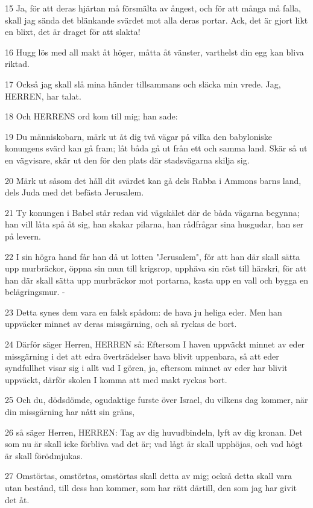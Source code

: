 \par 15 Ja, för att deras hjärtan må försmälta av ångest, och för att många må falla, skall jag sända det blänkande svärdet mot alla deras portar. Ack, det är gjort likt en blixt, det är draget för att slakta!
\par 16 Hugg lös med all makt åt höger, måtta åt vänster, varthelst din egg kan bliva riktad.
\par 17 Också jag skall slå mina händer tillsammans och släcka min vrede. Jag, HERREN, har talat.
\par 18 Och HERRENS ord kom till mig; han sade:
\par 19 Du människobarn, märk ut åt dig två vägar på vilka den babyloniske konungens svärd kan gå fram; låt båda gå ut från ett och samma land. Skär så ut en vägvisare, skär ut den för den plats där stadsvägarna skilja sig.
\par 20 Märk ut såsom det håll dit svärdet kan gå dels Rabba i Ammons barns land, dels Juda med det befästa Jerusalem.
\par 21 Ty konungen i Babel står redan vid vägskälet där de båda vägarna begynna; han vill låta spå åt sig, han skakar pilarna, han rådfrågar sina husgudar, han ser på levern.
\par 22 I sin högra hand får han då ut lotten "Jerusalem", för att han där skall sätta upp murbräckor, öppna sin mun till krigsrop, upphäva sin röst till härskri, för att han där skall sätta upp murbräckor mot portarna, kasta upp en vall och bygga en belägringsmur. -
\par 23 Detta synes dem vara en falsk spådom: de hava ju heliga eder. Men han uppväcker minnet av deras missgärning, och så ryckas de bort.
\par 24 Därför säger Herren, HERREN så: Eftersom I haven uppväckt minnet av eder missgärning i det att edra överträdelser hava blivit uppenbara, så att eder syndfullhet visar sig i allt vad I gören, ja, eftersom minnet av eder har blivit uppväckt, därför skolen I komma att med makt ryckas bort.
\par 25 Och du, dödsdömde, ogudaktige furste över Israel, du vilkens dag kommer, när din missgärning har nått sin gräns,
\par 26 så säger Herren, HERREN: Tag av dig huvudbindeln, lyft av dig kronan. Det som nu är skall icke förbliva vad det är; vad lågt är skall upphöjas, och vad högt är skall förödmjukas.
\par 27 Omstörtas, omstörtas, omstörtas skall detta av mig; också detta skall vara utan bestånd, till dess han kommer, som har rätt därtill, den som jag har givit det åt.
